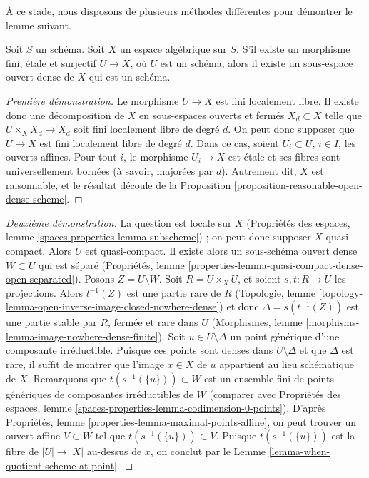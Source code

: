 \noindent
À ce stade, nous disposons de plusieurs méthodes différentes pour démontrer
le lemme suivant.

\begin{lemma}
\label{lemma-finite-etale-cover-dense-open-scheme}
Soit $S$ un schéma. Soit $X$ un espace algébrique sur $S$.
S'il existe un morphisme fini, étale et surjectif
$U \to X$, où $U$ est un schéma, alors il existe un sous-espace ouvert dense
de $X$ qui est un schéma.
\end{lemma}

\begin{proof}[Première démonstration]
Le morphisme $U \to X$ est fini localement libre. Il existe donc une
décomposition de $X$ en sous-espaces ouverts et fermés $X_d \subset X$ telle
que $U \times_X X_d \to X_d$ soit fini localement libre de degré $d$.
On peut donc supposer que $U \to X$ est fini localement libre de degré $d$.
Dans ce cas, soient $U_i \subset U$, $i \in I$, les ouverts affines.
Pour tout $i$, le morphisme $U_i \to X$ est étale et ses fibres sont
universellement bornées (à savoir, majorées par $d$).
Autrement dit, $X$ est raisonnable, et le résultat découle de la
Proposition \ref{proposition-reasonable-open-dense-scheme}.
\end{proof}

\begin{proof}[Deuxième démonstration]
La question est locale sur $X$
(Propriétés des espaces, lemme \ref{spaces-properties-lemma-subscheme}) ;
on peut donc supposer $X$ quasi-compact. Alors $U$ est quasi-compact.
Il existe alors un sous-schéma ouvert dense $W \subset U$ qui est séparé
(Propriétés, lemme
\ref{properties-lemma-quasi-compact-dense-open-separated}).
Posons $Z = U \setminus W$.
Soit $R = U \times_X U$, et soient $s, t : R \to U$ les projections.
Alors $t^{-1}(Z)$ est une partie rare de $R$
(Topologie, lemme \ref{topology-lemma-open-inverse-image-closed-nowhere-dense})
et donc $\Delta = s(t^{-1}(Z))$ est une partie stable par $R$, fermée et rare
dans $U$
(Morphismes, lemme \ref{morphisms-lemma-image-nowhere-dense-finite}).
Soit $u \in U \setminus \Delta$ un point générique d'une composante
irréductible. Puisque ces points sont denses dans $U \setminus \Delta$
et que $\Delta$ est rare, il suffit de montrer que l'image
$x \in X$ de $u$ appartient au lieu schématique de $X$.
Remarquons que $t(s^{-1}(\{u\})) \subset W$ est un
ensemble fini de points génériques de composantes irréductibles de $W$
(comparer avec
Propriétés des espaces, lemme
\ref{spaces-properties-lemma-codimension-0-points}).
D'après Propriétés, lemme \ref{properties-lemma-maximal-points-affine},
on peut trouver un ouvert affine $V \subset W$ tel que
$t(s^{-1}(\{u\})) \subset V$. Puisque $t(s^{-1}(\{u\}))$ est la fibre
de $|U| \to |X|$ au-dessus de $x$, on conclut par le
Lemme \ref{lemma-when-quotient-scheme-at-point}.
\end{proof}

